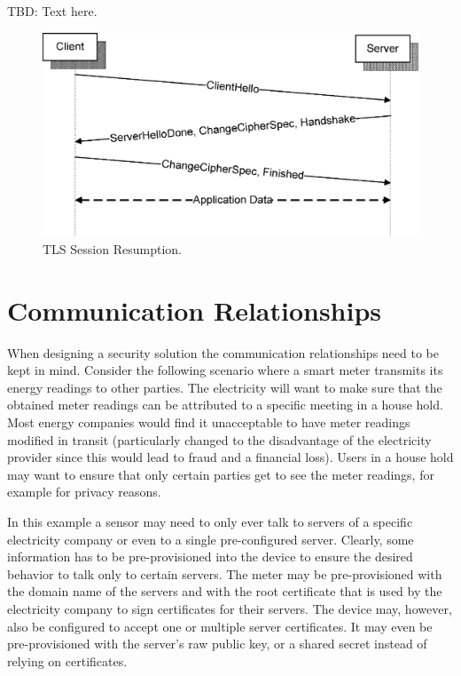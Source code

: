 \documentclass[a4paper, 10pt]{IEEEtran}
\begin{document}
TBD: Text here. 

\begin{figure}[!t]
 \centering
 \includegraphics[scale=0.50]{TLS-Session-Resumption}
 \caption{TLS Session Resumption.}
 \label{tls-session-resumption-figure}
\end{figure}

\section{Communication Relationships}
\label{relationships} 

When designing a security solution the communication relationships need to be kept in mind. Consider the following scenario where a smart meter transmits its energy readings to other parties. The electricity will want to make sure that the obtained meter readings can be attributed to a specific meeting in a house hold. Most energy companies would find it unacceptable to have meter readings modified in transit (particularly changed to the disadvantage of the electricity provider since this would lead to fraud and a financial loss). Users in a house hold may want to ensure that only certain parties get to see the meter readings, for example for privacy reasons.  

In this example a sensor may need to only ever talk to servers of a specific electricity company or even to a single pre-configured server. Clearly, some information has to be pre-provisioned into the device to ensure the desired behavior to talk only to certain servers. The meter may be pre-provisioned with the domain name of the servers and with the root certificate that is used by the electricity company to sign certificates for their servers. The device may, however, also be configured to accept one or multiple server certificates. It may even be pre-provisioned with the server's raw public key, or a shared secret instead of relying on certificates. 
\end{document}
